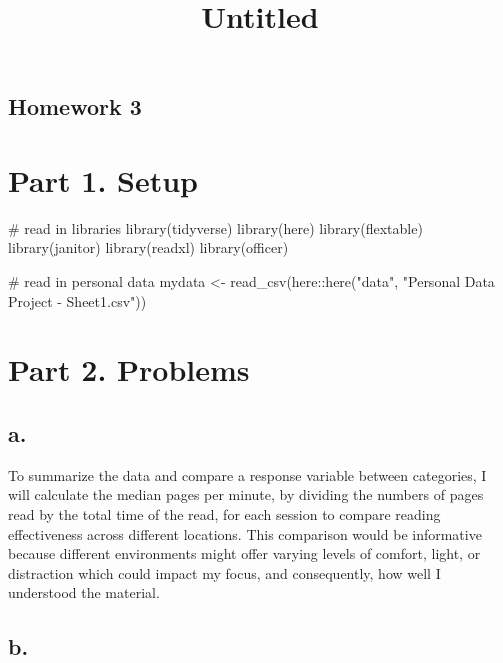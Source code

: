 \documentclass[
  letterpaper,
  DIV=11,
  numbers=noendperiod]{scrartcl}
\title{Untitled}
\author{}
\date{}
\newenvironment{Shaded}{\begin{snugshade}}{\end{snugshade}}
\newcommand{\CommentTok}[1]{\textcolor[rgb]{0.37,0.37,0.37}{#1}}
\newcommand{\FunctionTok}[1]{\textcolor[rgb]{0.28,0.35,0.67}{#1}}
\newcommand{\NormalTok}[1]{\textcolor[rgb]{0.00,0.23,0.31}{#1}}
\newcommand{\OtherTok}[1]{\textcolor[rgb]{0.00,0.23,0.31}{#1}}
\newcommand{\SpecialCharTok}[1]{\textcolor[rgb]{0.37,0.37,0.37}{#1}}
\newcommand{\StringTok}[1]{\textcolor[rgb]{0.13,0.47,0.30}{#1}}
\begin{document}
\maketitle


\subsection{Homework 3}\label{homework-3}

\section{Part 1. Setup}\label{part-1.-setup}

\begin{Shaded}
\begin{Highlighting}[]
\CommentTok{\# read in libraries}
\FunctionTok{library}\NormalTok{(tidyverse)}
\FunctionTok{library}\NormalTok{(here)}
\FunctionTok{library}\NormalTok{(flextable)}
\FunctionTok{library}\NormalTok{(janitor)}
\FunctionTok{library}\NormalTok{(readxl)}
\FunctionTok{library}\NormalTok{(officer)}

\CommentTok{\# read in personal data}
\NormalTok{mydata }\OtherTok{\textless{}{-}} \FunctionTok{read\_csv}\NormalTok{(here}\SpecialCharTok{::}\FunctionTok{here}\NormalTok{(}\StringTok{"data"}\NormalTok{, }\StringTok{"Personal Data Project {-} Sheet1.csv"}\NormalTok{))}
\end{Highlighting}
\end{Shaded}

\section{Part 2. Problems}\label{part-2.-problems}

\subsection{a.}\label{a.}

To summarize the data and compare a response variable between
categories, I will calculate the median pages per minute, by dividing
the numbers of pages read by the total time of the read, for each
session to compare reading effectiveness across different locations.
This comparison would be informative because different environments
might offer varying levels of comfort, light, or distraction which could
impact my focus, and consequently, how well I understood the material.

\subsection{b.}\label{b.}
\end{document}
